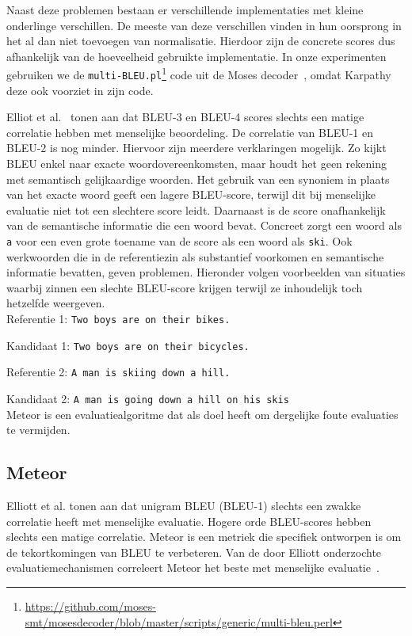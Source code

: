 Naast deze problemen bestaan er verschillende implementaties met kleine onderlinge verschillen. De meeste van deze verschillen vinden in hun oorsprong in het al dan niet toevoegen van normalisatie. Hierdoor zijn de concrete scores dus afhankelijk van de hoeveelheid gebruikte implementatie. In onze experimenten gebruiken we de \texttt{multi-BLEU.pl}\footnote{\url{https://github.com/moses-smt/mosesdecoder/blob/master/scripts/generic/multi-bleu.perl}} code uit de Moses decoder~\cite{Koehn2006}, omdat Karpathy deze ook voorziet in zijn code.

Elliot et al.~\cite{Elliott2014} tonen aan dat BLEU-3 en BLEU-4 scores slechts een matige correlatie hebben met menselijke beoordeling. De correlatie van BLEU-1 en BLEU-2 is nog minder.
Hiervoor zijn meerdere verklaringen mogelijk. Zo kijkt BLEU enkel naar exacte woordovereenkomsten, maar houdt het geen rekening met semantisch gelijkaardige woorden. Het gebruik van een synoniem in plaats van het exacte woord geeft een lagere BLEU-score, terwijl dit bij menselijke evaluatie niet tot een slechtere score leidt. Daarnaast is de score onafhankelijk van de semantische informatie die een woord bevat. Concreet zorgt een woord als \texttt{a} voor een even grote toename van de score als een woord als \texttt{ski}. Ook werkwoorden die in de referentiezin als substantief voorkomen en semantische informatie bevatten, geven problemen. Hieronder volgen voorbeelden van situaties waarbij zinnen een slechte BLEU-score krijgen terwijl ze inhoudelijk toch hetzelfde weergeven.
\\

Referentie 1: \texttt{Two boys are on their bikes.}

Kandidaat 1: \texttt{Two boys are on their bicycles.}

Referentie 2: \texttt{A man is skiing down a hill.}

Kandidaat 2: \texttt{A man is going down a hill on his skis}
\\

Meteor is een evaluatiealgoritme dat als doel heeft om dergelijke foute evaluaties te vermijden.

\subsection{Meteor}
Elliott et al. tonen aan dat unigram BLEU (BLEU-1) slechts een zwakke correlatie heeft met menselijke evaluatie. Hogere orde BLEU-scores hebben slechts een matige correlatie. Meteor is een metriek die specifiek ontworpen is om de tekortkomingen van BLEU te verbeteren. Van de door Elliott onderzochte evaluatiemechanismen correleert Meteor het beste met menselijke evaluatie~\cite{Elliott2014}.

